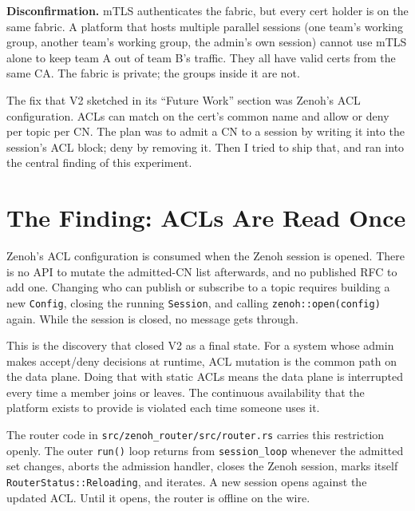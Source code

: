 \documentclass[11pt,a4paper]{article}
\begin{document}
\textbf{Disconfirmation.} mTLS authenticates the fabric, but
every cert holder is on the same fabric. A platform that hosts
multiple parallel sessions (one team's working group, another
team's working group, the admin's own session) cannot use mTLS
alone to keep team A out of team B's traffic. They all have valid
certs from the same CA. The fabric is private; the groups inside
it are not.

The fix that V2 sketched in its ``Future Work'' section was Zenoh's
ACL configuration. ACLs can match on the cert's common name and
allow or deny per topic per CN. The plan was to admit a CN to a
session by writing it into the session's ACL block; deny by
removing it. Then I tried to ship that, and ran into the central
finding of this experiment.

\section{The Finding: ACLs Are Read Once}

\begin{findingbox}
Zenoh's ACL configuration is consumed when the Zenoh session is
opened. There is no API to mutate the admitted-CN list afterwards,
and no published RFC to add one. Changing who can publish or
subscribe to a topic requires building a new \texttt{Config},
closing the running \texttt{Session}, and calling
\texttt{zenoh::open(config)} again. While the session is closed,
no message gets through.
\end{findingbox}

This is the discovery that closed V2 as a final state. For a
system whose admin makes accept/deny decisions at runtime, ACL
mutation is the common path on the data plane. Doing that with
static ACLs means the data plane is interrupted every time a
member joins or leaves. The continuous availability that the
platform exists to provide is violated each time someone uses it.

The router code in \texttt{src/zenoh\_router/src/router.rs} carries
this restriction openly. The outer \texttt{run()} loop returns
from \texttt{session\_loop} whenever the admitted set changes,
aborts the admission handler, closes the Zenoh session, marks
itself \texttt{RouterStatus::Reloading}, and iterates. A new
session opens against the updated ACL. Until it opens, the router
is offline on the wire.
\end{document}
